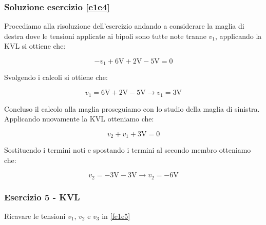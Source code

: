 \documentclass[../main.tex]{subfiles}
\begin{document}
\subsubsection*{Soluzione esercizio \ref{e1e4}}

Procediamo alla risoluzione dell'esercizio andando a considerare la maglia di destra dove le tensioni applicate ai bipoli sono tutte note tranne $v_1$, applicando la KVL si ottiene che:

\begin{equation}
	-v_1 + \text{6V} + \text{2V} - \text{5V} = 0
\end{equation}

Svolgendo i calcoli si ottiene che:

\begin{equation}
	v_1 = \text{6V} + \text{2V} - \text{5V} \rightarrow v_1 = \text{3V}
\end{equation}

Concluso il calcolo alla maglia proseguiamo con lo studio della maglia di sinistra. Applicando nuovamente la KVL otteniamo che:

\begin{equation}
	v_2 + v_1 + \text{3V} = 0
\end{equation}

Sostituendo i termini noti e spostando i termini al secondo membro otteniamo che:

\begin{equation}
	v_2 = - \text{3V} - \text{3V} \rightarrow v_2 = -\text{6V}
\end{equation}

\vspace*{1.5cm}
\subsubsection{Esercizio 5 - KVL}
\label{e1e5}

Ricavare le tensioni $v_1$, $v_2$ e $v_3$ in \autoref{fe1e5}
\end{document}
